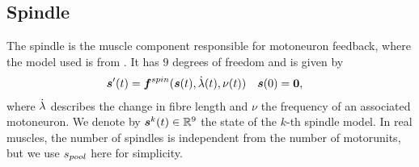 \subsection{Spindle}
The spindle is the muscle component responsible for motoneuron feedback, where the model used is from \cite{Mileusnic2006}.
It has $9$ degrees of freedom and is given by
\begin{align}
	\boldsymbol{s}'(t) &= \boldsymbol{f}^{spin}(\boldsymbol{s}(t),\dot{\lambda}(t),\nu(t)) & \boldsymbol{s}(0) &= \boldsymbol{0},\label{def:spindlesys}
\end{align}
where $\dot{\lambda}$ describes the change in fibre length and $\nu$ the frequency of an associated motoneuron.
We denote by $\boldsymbol{s}^k(t)\in\mathbb{R}^9$ the state of the $k$-th spindle model. In real muscles, the number of spindles is independent from the
number of motorunits, but we use ${s_{pool}}$ here for simplicity.


